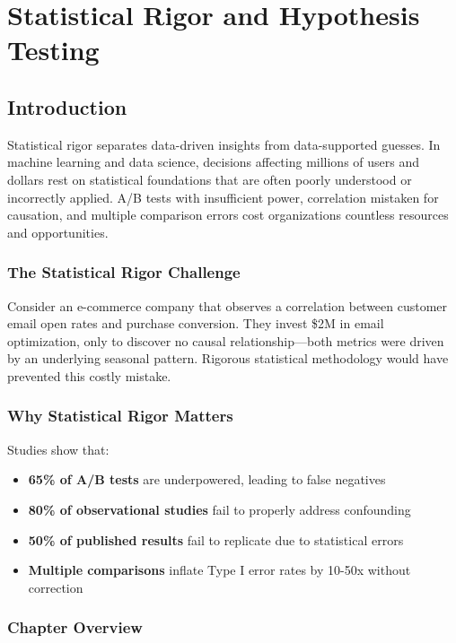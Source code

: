 \chapter{Statistical Rigor and Hypothesis Testing}

\section{Introduction}

Statistical rigor separates data-driven insights from data-supported guesses. In machine learning and data science, decisions affecting millions of users and dollars rest on statistical foundations that are often poorly understood or incorrectly applied. A/B tests with insufficient power, correlation mistaken for causation, and multiple comparison errors cost organizations countless resources and opportunities.

\subsection{The Statistical Rigor Challenge}

Consider an e-commerce company that observes a correlation between customer email open rates and purchase conversion. They invest \$2M in email optimization, only to discover no causal relationship---both metrics were driven by an underlying seasonal pattern. Rigorous statistical methodology would have prevented this costly mistake.

\subsection{Why Statistical Rigor Matters}

Studies show that:
\begin{itemize}
    \item \textbf{65\% of A/B tests} are underpowered, leading to false negatives
    \item \textbf{80\% of observational studies} fail to properly address confounding
    \item \textbf{50\% of published results} fail to replicate due to statistical errors
    \item \textbf{Multiple comparisons} inflate Type I error rates by 10-50x without correction
\end{itemize}

\subsection{Chapter Overview}

